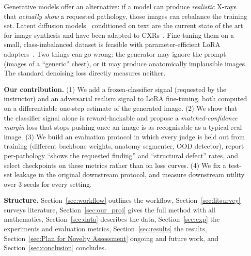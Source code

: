 \documentclass[twoside,english]{article}
\begin{document}
Generative models offer an alternative: if a model can produce \emph{realistic} X-rays that \emph{actually show} a requested pathology, those images can rebalance the training set. Latent diffusion models~\citep{rombach2022ldm} conditioned on text are the current state of the art for image synthesis and have been adapted to CXRs~\citep{chambon2022roentgen}. Fine-tuning them on a small, class-imbalanced dataset is feasible with parameter-efficient LoRA adapters~\citep{hu2022lora}. Two things can go wrong: the generator may ignore the prompt (images of a ``generic'' chest), or it may produce anatomically implausible images. The standard denoising loss directly measures neither.

\textbf{Our contribution.} (1) We add a frozen-classifier signal (requested by the instructor) and an adversarial realism signal to LoRA fine-tuning, both computed on a differentiable one-step estimate of the generated image. (2) We show that the classifier signal alone is reward-hackable and propose a \emph{matched-confidence margin} loss that stops pushing once an image is as recognisable as a typical real image. (3) We build an evaluation protocol in which every judge is held out from training (different backbone weights, anatomy segmenter, OOD detector), report per-pathology ``shows the requested finding'' and ``structural defect'' rates, and select checkpoints on these metrics rather than on loss curves. (4) We fix a test-set leakage in the original downstream protocol, and measure downstream utility over 3 seeds for every setting.

\textbf{Structure.} Section~\ref{sec:workflow} outlines the workflow, Section~\ref{sec:litsurvey} surveys literature, Section~\ref{sec:our_proj} gives the full method with all mathematics, Section~\ref{sec:data} describes the data, Section~\ref{sec:exp} the experiments and evaluation metrics, Section~\ref{sec:results} the results, Section~\ref{sec:Plan for Novelty Assessment} ongoing and future work, and Section~\ref{sec:conclusion} concludes.

\end{document}
